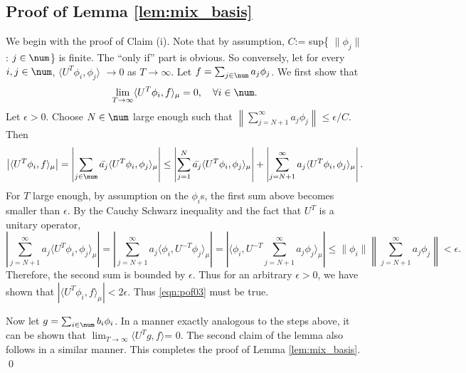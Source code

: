 \documentclass[12pt,oneside]{article}
\begin{document}
\subsection{Proof of Lemma \ref{lem:mix_basis} }  \label{sec:proof:mix_basis}

We begin with the proof of Claim (i). Note that by assumption, $C$:= sup\{ $\|\phi_j\|$ : $j\in\num$\} is finite. The ``only if'' part is obvious. So conversely, let for every $i,j\in\num$, $\langle U^T \phi_i, \phi_j \rangle$ $\to 0$ as $T\to\infty$. Let $f=\sum_{j\in\num} a_j \phi_j$. We first show that
%
\begin{equation} \label{eqn:pof03}
    \lim_{T\to\infty} \langle U^T \phi_i, f \rangle_\mu = 0, \quad \forall i\in\num .
\end{equation}
%
Let $\epsilon>0$. %
Choose $N\in\num$ large enough such that $\left\|\sum_{j=N+1}^{\infty} a_j \phi_j \right\| \leq \epsilon/C$. Then
%
\[\left| \langle U^T \phi_i, f \rangle_\mu \right| = \left| \sum_{j\in\num} \bar{a_j} \langle U^T \phi_i, \phi_j \rangle_\mu \right| 
\leq \left| \sum_{j=1}^{N} \bar{a_j} \langle U^T \phi_i, \phi_j \rangle_\mu \right| + \left| \sum_{j=N+1}^{\infty} a_j\langle U^T \phi_i, \phi_j \rangle_\mu \right|.\]
%
For $T$ large enough, by assumption on the $\phi_i$s, the first sum above becomes smaller than $\epsilon$. By the Cauchy Schwarz inequality and the fact that $U^T$ is a unitary operator,
%
\[  \left| \sum_{j=N+1}^{\infty} a_j\langle U^T \phi_i, \phi_j \rangle_\mu \right| = \left| \sum_{j=N+1}^{\infty} a_j\langle \phi_i, U^{-T} \phi_j \rangle_\mu \right| = \left| \langle \phi_i,U^{-T} \sum_{j=N+1}^{\infty} a_j  \phi_j \rangle_\mu \right| \leq \|\phi_i\| \left\|\sum_{j=N+1}^{\infty} a_j  \phi_j \right\| < \epsilon .\]
%
Therefore, the second sum is bounded by $\epsilon$. Thus for an arbitrary $\epsilon>0$, we have shown that $\left| \langle U^T \phi_i, f \rangle_\mu \right|<2\epsilon$. Thus \eqref{eqn:pof03} must be true.

Now let $g=\sum_{i\in\num} b_i \phi_i$. In a manner exactly analogous to the steps above, it can be shown that $\lim_{T\to\infty} \langle U^T g, f \rangle$= 0. The second claim of the lemma also follows in a similar manner. This completes the proof of Lemma \ref{lem:mix_basis}. \qed
\end{document}
